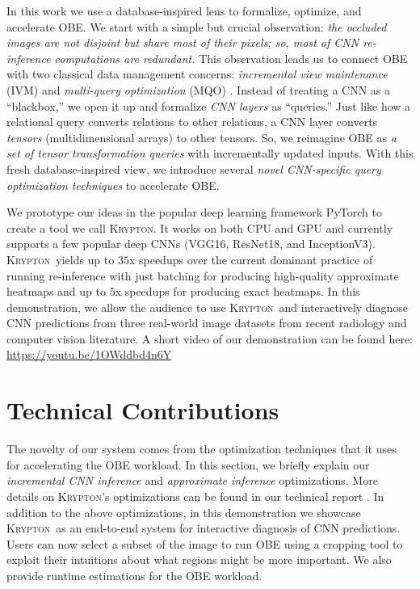 \documentclass{vldb}
\newcommand{\system}{\textsc{Krypton}}
\begin{document}
In this work we use a database-inspired lens to formalize, optimize, and accelerate OBE. We start with a simple but crucial observation: \textit{the occluded images are not disjoint but share most of their pixels; so, most of CNN re-inference computations are redundant.} This observation leads us to connect OBE with two classical data management concerns: \textit{incremental view maintenance} (IVM) \cite{chirkova2012materialized} and \textit{multi-query optimization} (MQO) \cite{sellis1988multiple}. Instead of treating a CNN as a ``blackbox,'' we open it up and formalize \textit{CNN layers} as ``queries.'' Just like how a relational query converts relations to other relations, a CNN layer converts \textit{tensors} (multidimensional arrays) to other tensors. So, we reimagine OBE as \textit{a set of tensor transformation queries} with incrementally updated inputs. With this fresh database-inspired view, we introduce several \textit{novel CNN-specific query optimization techniques} to accelerate OBE.

We prototype our ideas in the popular deep learning framework PyTorch to create a tool we call \system. It works on both CPU and GPU and currently supports a few popular deep CNNs (VGG16, ResNet18, and InceptionV3).
\system ~yields up to $35$x speedups over the current dominant practice of running re-inference with just batching for producing high-quality approximate heatmaps and up to $5$x speedups for producing exact heatmaps.
In this demonstration, we allow the audience to use \system~and interactively diagnose CNN predictions from three real-world image datasets from recent radiology and computer vision literature.
A short video of our demonstration can be found here: \url{https://youtu.be/1OWddbd4n6Y}

\section{Technical Contributions}
The novelty of our system comes from the optimization techniques that it uses for accelerating the OBE workload.
In this section, we briefly explain our \textit{incremental CNN inference} and \textit{approximate inference} optimizations.
More details on \system's optimizations can be found in our technical report \cite{krypton}.
In addition to the above optimizations, in this demonstration we showcase \system~as an end-to-end system for interactive diagnosis of CNN predictions.
Users can now select a subset of the image to run OBE using a cropping tool to exploit their intuitions about what regions might be more important.
We also provide runtime estimations for the OBE workload. 
\end{document}
